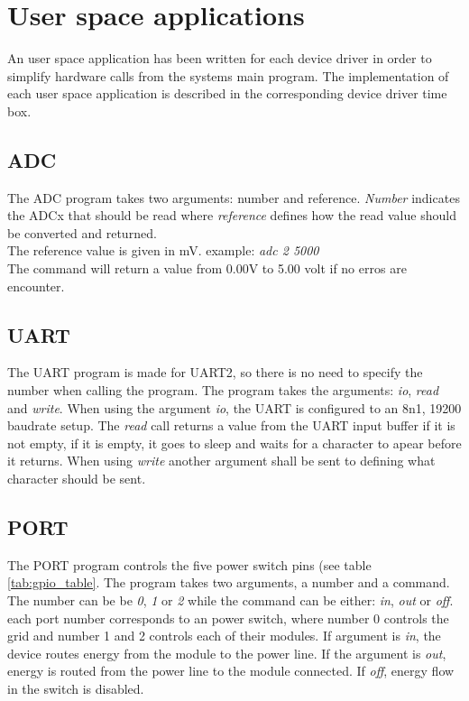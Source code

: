 \section{User space applications}
An user space application has been written for each device driver in order to simplify hardware calls from the systems main program. The implementation of each user space application is described in the corresponding device driver time box. 
\subsection{ADC}
The ADC program takes two arguments: number and reference. \textit{Number} indicates the ADCx that should be read where \textit{reference} defines how the read value should be converted and returned. 
\\The reference value is given in mV.
\p example: \textit{adc 2 5000}
\\The command will return a value from 0.00V to 5.00 volt if no erros are encounter. 
\subsection{UART}
The UART program is made for UART2, so there is no need to specify the number when calling the program. The program takes the arguments: \textit{io}, \textit{read} and \textit{write}. When using the argument \textit{io}, the UART is configured to an 8n1, 19200 baudrate setup. The \textit{read} call returns a value from the UART input buffer if it is not empty, if it is empty, it goes to sleep and waits for a character to apear before it returns. When using \textit{write} another argument shall be sent to defining what character should be sent.
\subsection{PORT}
The PORT program controls the five power switch pins (see table \ref{tab:gpio_table}. The program takes two arguments, a number and a command. The number can be be \textit{0}, \textit{1} or \textit{2} while the command can be either: \textit{in}, \textit{out} or \textit{off}.
\p each port number corresponds to an power switch, where number 0 controls the grid and number 1 and 2 controls each of their modules. 
\p If argument is \textit{in}, the device routes energy from the module to the power line. If the argument is \textit{out}, energy is routed from the power line to the module connected. If \textit{off}, energy flow in the switch is disabled.